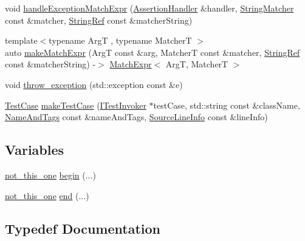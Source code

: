 \begin{DoxyCompactItemize}
\item 
void \mbox{\hyperlink{namespace_catch_a3a96a82307107087642e22fc4be5844d}{handle\+Exception\+Match\+Expr}} (\mbox{\hyperlink{class_catch_1_1_assertion_handler}{Assertion\+Handler}} \&handler, \mbox{\hyperlink{namespace_catch_aba438977e831821a2eeca82b9b4f4af2}{String\+Matcher}} const \&matcher, \mbox{\hyperlink{class_catch_1_1_string_ref}{String\+Ref}} const \&matcher\+String)
\item 
{\footnotesize template$<$typename ArgT , typename MatcherT $>$ }\\auto \mbox{\hyperlink{namespace_catch_a23a9a9a6dfef7ecd5e0eaf553fc52de6}{make\+Match\+Expr}} (ArgT const \&arg, MatcherT const \&matcher, \mbox{\hyperlink{class_catch_1_1_string_ref}{String\+Ref}} const \&matcher\+String) -\/$>$ \mbox{\hyperlink{class_catch_1_1_match_expr}{Match\+Expr}}$<$ ArgT, MatcherT $>$
\item 
void \mbox{\hyperlink{namespace_catch_a3cbceeab9252d1b752f66a2826e92548}{throw\+\_\+exception}} (std\+::exception const \&e)
\item 
\mbox{\hyperlink{class_catch_1_1_test_case}{Test\+Case}} \mbox{\hyperlink{namespace_catch_a5e63df38d06a43d4cee17454e724b5c0}{make\+Test\+Case}} (\mbox{\hyperlink{struct_catch_1_1_i_test_invoker}{I\+Test\+Invoker}} $\ast$test\+Case, std\+::string const \&class\+Name, \mbox{\hyperlink{struct_catch_1_1_name_and_tags}{Name\+And\+Tags}} const \&name\+And\+Tags, \mbox{\hyperlink{struct_catch_1_1_source_line_info}{Source\+Line\+Info}} const \&line\+Info)
\end{DoxyCompactItemize}
\subsection*{Variables}
\begin{DoxyCompactItemize}
\item 
\mbox{\hyperlink{struct_catch_1_1not__this__one}{not\+\_\+this\+\_\+one}} \mbox{\hyperlink{namespace_catch_ac7ccff5c186bffa3b448b218ecf15956}{begin}} (...)
\item 
\mbox{\hyperlink{struct_catch_1_1not__this__one}{not\+\_\+this\+\_\+one}} \mbox{\hyperlink{namespace_catch_a71fef6a57614eb2d9751f8586ff6de6a}{end}} (...)
\end{DoxyCompactItemize}


\subsection{Typedef Documentation}
\mbox{\label{namespace_catch_ae8d8673884dc36b98875106322a2a37b}} 
